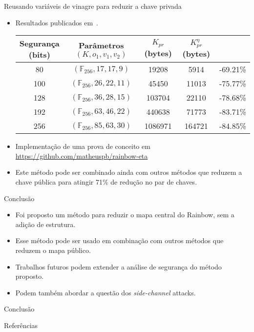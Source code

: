 \documentclass[]{beamer}
\begin{document}
\begin{frame}{Reusando variáveis de vinagre para reduzir a chave privada}
	\begin{itemize}[<+->]
		\item Resultados publicados em~\cite{zambonin2019handling}.
		\begin{table}
		\begin{tabular}{|c|c|c|c|c|}
			\hline
			\thead{Segurança\\(bits)} &
			\thead{Parâmetros\\$(K, o_1, v_1, v_2)$} &
			\thead{$K_{pr}$\\(bytes)} & \thead{$K^{\eta}_{pr}$\\(bytes)} &
			\thead{Redução} \\ \hline
			80  & $(\mathbb{F}_{256},17,17,9)$  & 19208   & 5914   & -69.21\%
			\\ \hline
			100 & $(\mathbb{F}_{256},26,22,11)$ & 45450   & 11013  & -75.77\%
			\\ \hline
			128 & $(\mathbb{F}_{256},36,28,15)$ & 103704  & 22110  & -78.68\%
			\\ \hline
			192 & $(\mathbb{F}_{256},63,46,22)$ & 440638  & 71773  & -83.71\%
			\\ \hline
			256 & $(\mathbb{F}_{256},85,63,30)$ & 1086971 & 164721 & -84.85\%
			\\ \hline
		\end{tabular}
		\end{table}
		\item Implementação de uma prova de conceito em
		\url{https://github.com/matheuspb/rainbow-eta}
		\item Este método pode ser combinado ainda com outros métodos que
		reduzem a chave pública para atingir 71\% de redução no par de chaves.
	\end{itemize}
\end{frame}

\begin{frame}{Conclusão}
	\begin{itemize}[<+->]
		\item Foi proposto um método para reduzir o mapa central do Rainbow,
		sem a adição de estrutura.
		\item Esse método pode ser usado em combinação com outros métodos que
		reduzem o mapa público.
		\item Trabalhos futuros podem extender a análise de segurança do método
		proposto.
		\item Podem também abordar a questão dos \textit{side-channel} attacks.
	\end{itemize}
\end{frame}

\begin{frame}{Conclusão}
\end{frame}

\begin{frame}[allowframebreaks]{Referências}
	
	
\end{frame}
\end{document}
